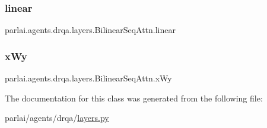 \subsubsection{\texorpdfstring{linear}{linear}}
{\footnotesize\ttfamily parlai.\+agents.\+drqa.\+layers.\+Bilinear\+Seq\+Attn.\+linear}

\mbox{\label{classparlai_1_1agents_1_1drqa_1_1layers_1_1BilinearSeqAttn_a6a14946097618712765aba7243f0c075}} 
\subsubsection{\texorpdfstring{x\+Wy}{xWy}}
{\footnotesize\ttfamily parlai.\+agents.\+drqa.\+layers.\+Bilinear\+Seq\+Attn.\+x\+Wy}



The documentation for this class was generated from the following file\+:\begin{DoxyCompactItemize}
\item 
parlai/agents/drqa/\hyperlink{layers_8py}{layers.\+py}\end{DoxyCompactItemize}
